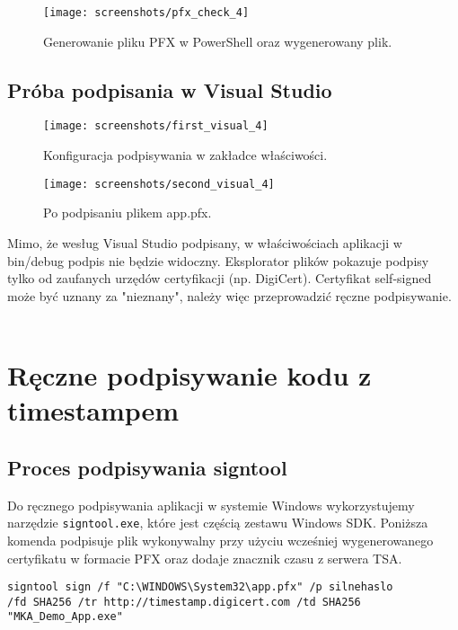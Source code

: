 \documentclass{article}
\begin{document}
\begin{figure}[H]
    \centering
    \texttt{[image: screenshots/pfx\_check\_4]}
    \caption{Generowanie pliku PFX w PowerShell oraz wygenerowany plik.}
    \label{fig:pfx_export}
\end{figure}

\subsection{Próba podpisania w Visual Studio}
\begin{figure}[H]
    \centering
    \texttt{[image: screenshots/first\_visual\_4]}
    \caption{Konfiguracja podpisywania w zakładce właściwości.}
    \label{fig:vs_signing}
\end{figure}
\begin{figure}[H]
    \centering
    \texttt{[image: screenshots/second\_visual\_4]}
    \caption{Po podpisaniu plikem app.pfx.}
    \label{fig:vs_signing}
\end{figure}

Mimo, że wesług Visual Studio podpisany, w właściwościach aplikacji w bin/debug podpis nie będzie widoczny. 
Eksplorator plików pokazuje podpisy tylko od zaufanych urzędów certyfikacji (np. DigiCert). 
Certyfikat self-signed może być uznany za "nieznany", należy więc przeprowadzić ręczne podpisywanie. \\ \\ 

\section{Ręczne podpisywanie kodu z timestampem}

\subsection{Proces podpisywania signtool}

Do ręcznego podpisywania aplikacji w systemie Windows wykorzystujemy narzędzie \texttt{signtool.exe}, które jest częścią zestawu Windows SDK. Poniższa komenda podpisuje plik wykonywalny przy użyciu wcześniej wygenerowanego certyfikatu w formacie PFX oraz dodaje znacznik czasu z serwera TSA.

\begin{lstlisting}[style=command, caption=Podpisywanie signtool]
signtool sign /f "C:\WINDOWS\System32\app.pfx" /p silnehaslo 
/fd SHA256 /tr http://timestamp.digicert.com /td SHA256 
"MKA_Demo_App.exe"
\end{lstlisting}
\end{document}

